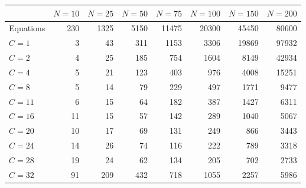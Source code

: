 \begin{tabular}{lrrrrrrr}
\toprule
{} &  $N = 10$ &  $N = 25$ &  $N = 50$ &  $N = 75$ &  $N = 100$ &  $N = 150$ &  $N = 200$ \\
\midrule
Equations &       230 &      1325 &      5150 &     11475 &      20300 &      45450 &      80600 \\
\midrule
$C = 1$   &         3 &        43 &       311 &      1153 &       3306 &      19869 &      97932 \\
$C = 2$   &         4 &        25 &       185 &       754 &       1604 &       8149 &      42934 \\
$C = 4$   &         5 &        21 &       123 &       403 &        976 &       4008 &      15251 \\
$C = 8$   &         5 &        14 &        79 &       229 &        497 &       1771 &       9477 \\
$C = 11$  &         6 &        15 &        64 &       182 &        387 &       1427 &       6311 \\
$C = 16$  &        11 &        15 &        57 &       142 &        289 &       1040 &       5067 \\
$C = 20$  &        10 &        17 &        69 &       131 &        249 &        866 &       3443 \\
$C = 24$  &        14 &        26 &        74 &       116 &        222 &        789 &       3318 \\
$C = 28$  &        19 &        24 &        62 &       134 &        205 &        702 &       2733 \\
$C = 32$  &        91 &       209 &       432 &       718 &       1055 &       2257 &       5986 \\
\bottomrule
\end{tabular}